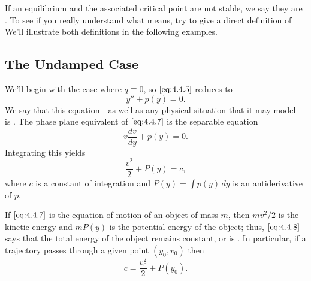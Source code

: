 \documentclass{ximera}
\begin{document}
\begin{center}
\end{center}

 
If an equilibrium and the associated critical point are not stable, we
say they are . To see if you really understand what
 means, try to give a direct definition of 
We'll illustrate both definitions in
the following examples.
 
 
\subsection*{The Undamped Case}
 
We'll begin with the case where $q\equiv0$, so  $\eqref{eq:4.4.5}$
reduces to
 \begin{equation} \label{eq:4.4.7}
y''+p(y)=0.
\end{equation}
We say that this equation - as well as any physical situation
that it may model - is .
The phase plane equivalent of $\eqref{eq:4.4.7}$ is  the
separable equation
$$
v\frac{dv}{dy}+p(y)=0.
$$
 Integrating this  yields
\begin{equation} \label{eq:4.4.8}
\frac{v^2}{2}+P(y)=c,
\end{equation}
where $c$ is a constant of integration and $P(y)=\int p(y)\,dy$ is an
antiderivative of $p$.
 
If $\eqref{eq:4.4.7}$ is the equation of motion of an object of
mass $m$, then
 $mv^2/2$ is the kinetic energy and $mP(y)$ is the
potential energy of the object;   thus, $\eqref{eq:4.4.8}$ says that the
total
energy of the object remains constant, or is . In
particular, if a trajectory passes through a given point $(y_0,v_0)$
then
$$
c=\frac{v_0^2}{2}+P(y_0).
$$
 
\end{document}

